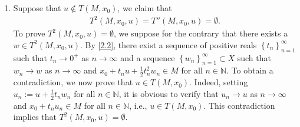 \documentclass[a4paper]{article}
\numberwithin{equation}{section}
\begin{document}
\begin{enumerate}
\item Suppose that $u\notin T\left(M,x_0\right)$, we claim that
\begin{align}
\label{2.85}
{T^2}\left( {M,{x_0},u} \right) = T''\left( {M,{x_0},u} \right) = \emptyset .
\end{align}
To prove ${T^2}\left( {M,{x_0},u} \right) = \emptyset $, we suppose for the contrary that there exists a $w\in T^2\left(M,x_0,u\right)$. By \eqref{2.2}, there exist a sequence of positive reals $\left\{ {{t_n}} \right\}_{n = 1}^\infty $ such that $t_n\to 0^+$ as $n\to \infty$ and a sequence $\left\{ {{w_n}} \right\}_{n = 1}^\infty  \subset X$ such that $w_n\to w$ as $n\to \infty$ and ${x_0} + {t_n}u + \frac{1}{2}t_n^2{w_n} \in M$   for all $n\in \mathbb{N}$. To obtain a contradiction, we now prove that $u\in T\left(M,x_0\right)$. Indeed, setting $u_n:=u+\frac{1}{2}t_nw_n$ for all $n\in \mathbb{N}$, it is obvious to verify that $u_n\to u$ as $n\to \infty$ and $x_0+t_nu_n\in M$ for all $n\in \mathbb{N}$, i.e., $u\in T\left(M,x_0\right)$. This contradiction implies that $T^2\left(M,x_0,u\right) =\emptyset$.


\end{enumerate}
\end{document}
